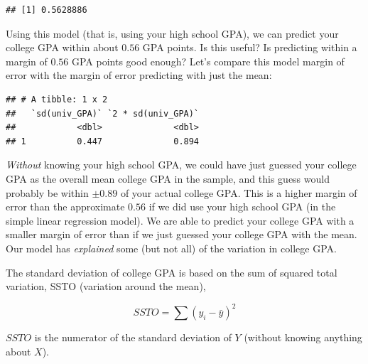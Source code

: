 \documentclass[
]{book}
\newenvironment{Shaded}{\begin{snugshade}}{\end{snugshade}}
\newcommand{\DataTypeTok}[1]{\textcolor[rgb]{0.13,0.29,0.53}{#1}}
\newcommand{\DecValTok}[1]{\textcolor[rgb]{0.00,0.00,0.81}{#1}}
\newcommand{\KeywordTok}[1]{\textcolor[rgb]{0.13,0.29,0.53}{\textbf{#1}}}
\newcommand{\NormalTok}[1]{#1}
\newcommand{\OperatorTok}[1]{\textcolor[rgb]{0.81,0.36,0.00}{\textbf{#1}}}
\newcommand{\StringTok}[1]{\textcolor[rgb]{0.31,0.60,0.02}{#1}}
\begin{document}
\begin{verbatim}
## [1] 0.5628886
\end{verbatim}

Using this model (that is, using your high school GPA), we can predict your college GPA within about \(0.56\) GPA points. Is this useful? Is predicting within a margin of \(0.56\) GPA points good enough? Let's compare this model margin of error with the margin of error predicting with just the mean:

\begin{Shaded}
\end{Shaded}

\begin{verbatim}
## # A tibble: 1 x 2
##   `sd(univ_GPA)` `2 * sd(univ_GPA)`
##            <dbl>              <dbl>
## 1          0.447              0.894
\end{verbatim}

\emph{Without} knowing your high school GPA, we could have just guessed your college GPA as the overall mean college GPA in the sample, and this guess would probably be within \(\pm 0.89\) of your actual college GPA. This is a higher margin of error than the approximate \(0.56\) if we did use your high school GPA (in the simple linear regression model). We are able to predict your college GPA with a smaller margin of error than if we just guessed your college GPA with the mean. Our model has \emph{explained} some (but not all) of the variation in college GPA.

The standard deviation of college GPA is based on the sum of squared total variation, SSTO (variation around the mean),

\[ SSTO = \sum{(y_i -\bar{y})^2} \]

\(SSTO\) is the numerator of the standard deviation of \(Y\) (without knowing anything about \(X\)).

\begin{Shaded}
\end{Shaded}
\end{document}
